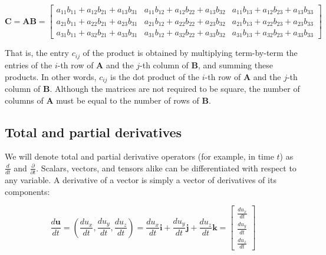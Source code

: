 \documentclass[12pt]{article}
\numberwithin{equation}{section}
\numberwithin{figure}{section}
\numberwithin{table}{section}
\begin{document}
\begin{equation}
  \mathbf{C} = \mathbf{A} \mathbf{B} =
  \begin{bmatrix}
    a_{11} b_{11} + a_{12} b_{21} + a_{13} b_{31} &
    a_{11} b_{12} + a_{12} b_{22} + a_{13} b_{32} &
    a_{11} b_{13} + a_{12} b_{23} + a_{13} b_{33} \\
    a_{21} b_{11} + a_{22} b_{21} + a_{23} b_{31} &
    a_{21} b_{12} + a_{22} b_{22} + a_{23} b_{32} &
    a_{21} b_{13} + a_{22} b_{23} + a_{23} b_{33} \\
    a_{31} b_{11} + a_{32} b_{21} + a_{33} b_{31} &
    a_{31} b_{12} + a_{32} b_{22} + a_{33} b_{32} &
    a_{31} b_{13} + a_{32} b_{23} + a_{33} b_{33}
  \end{bmatrix}
\end{equation}

That is, the entry $c_{ij}$ of the product is obtained by multiplying
term-by-term the entries of the $i$-th row of $\mathbf{A}$ and the $j$-th column
of $\mathbf{B}$, and summing these products.
In other words, $c_{ij}$ is the dot product of the $i$-th row of $\mathbf{A}$
and the $j$-th column of $\mathbf{B}$.
Although the matrices are not required to be square, the number of columns
of $\mathbf{A}$ must be equal to the number of rows of $\mathbf{B}$.

\subsection{Total and partial derivatives}

We will denote total and partial
derivative operators (for example, in time $t$)
as $\frac{d}{dt}$ and $\frac{\partial}{\partial t}$.
Scalars, vectors, and tensors alike can be differentiated with respect to any
variable.
A derivative of a vector is simply a vector of derivatives of its components:

\begin{equation}
  \frac{d\mathbf{u}}{dt}
    = \left(\frac{d u_x}{d t}, \frac{d u_y}{d t}, \frac{d u_z}{d t}\right)
    = \frac{du_x}{dt} \mathbf{i} + \frac{du_y}{dt} \mathbf{j} + \frac{du_z}{dt} \mathbf{k}
    = \begin{bmatrix}
        \frac{du_x}{dt} \\
        \frac{du_y}{dt} \\
        \frac{du_z}{dt}
      \end{bmatrix}
\end{equation}
\end{document}
